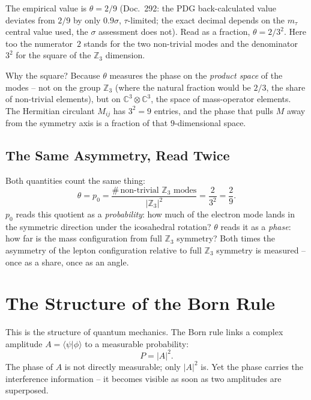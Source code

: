 The empirical value is $\theta = 2/9$ (Doc.~292: the PDG back-calculated value deviates from
$2/9$ by only $0.9\sigma$, $\tau$-limited; the exact decimal depends on the $m_\tau$ central
value used, the $\sigma$ assessment does not). Read as a fraction, $\theta = 2/3^2$. Here too
the numerator~$2$ stands for the two non-trivial modes and the denominator $3^2$ for the square
of the $\mathbb{Z}_3$ dimension.

Why the square? Because $\theta$ measures the phase on the \emph{product space} of the modes --
not on the group $\mathbb{Z}_3$ (where the natural fraction would be $2/3$, the share of
non-trivial elements), but on $\mathbb{C}^3 \otimes \mathbb{C}^3$, the space of mass-operator
elements. The Hermitian circulant $M_{ij}$ has $3^2 = 9$ entries, and the phase that pulls $M$
away from the symmetry axis is a fraction of that $9$-dimensional space.

\subsection{The Same Asymmetry, Read Twice}

Both quantities count the same thing:
\begin{equation}\label{eq:quotient}
  \theta = p_0 = \frac{\#\,\text{non-trivial }\mathbb{Z}_3\text{ modes}}{|\mathbb{Z}_3|^2}
  = \frac{2}{3^2} = \frac{2}{9}.
\end{equation}
$p_0$ reads this quotient as a \emph{probability}: how much of the electron mode lands in the
symmetric direction under the icosahedral rotation? $\theta$ reads it as a \emph{phase}: how far
is the mass configuration from full $\mathbb{Z}_3$ symmetry? Both times the asymmetry of the
lepton configuration relative to full $\mathbb{Z}_3$ symmetry is measured -- once as a share,
once as an angle.

\section{The Structure of the Born Rule}

This is the structure of quantum mechanics. The Born rule \EM{} links a complex amplitude
$A = \langle\psi|\phi\rangle$ to a measurable probability:
\[
  P = |A|^2.
\]
The phase of $A$ is not directly measurable; only $|A|^2$ is. Yet the phase carries the
interference information -- it becomes visible as soon as two amplitudes are superposed.

